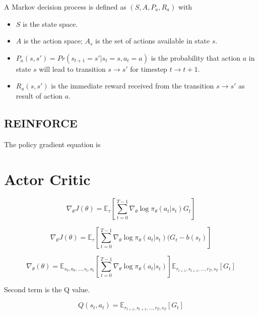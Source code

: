 \documentclass[8pt,oneside]{book}
\begin{document}
A Markov decision process is defined as $(S,A,P_a,R_a)$ with

\begin{itemize}
    \item $S$ is the state space.
    \item $A$ is the action space; $A_s$ is the set of actions available
        in state $s$.
    \item $P_a (s, s' ) = Pr(s_{t+1} = s' | s_t = s, a_t =a)$ is the
        probability that action $a$ in state $s$ will lead to transition
        $s\rightarrow s'$ for timestep $t\rightarrow t+1$.
    \item $R_a(s,s')$ is the immediate reward received from the transition
        $s\rightarrow s'$ as result of action $a$.
\end{itemize}

\newpage

\section{REINFORCE}

The policy gradient equation is

\chapter{Actor Critic}

\begin{equation}
    \nabla_\theta J(\theta) = \mathbb{E}_\tau \left[
        \sum_{t=0}^{T-1}\nabla_\theta\log\pi_\theta\left(a_t|s_t\right)G_t\right]
\end{equation}


\begin{equation}
    \nabla_\theta J(\theta) = \mathbb{E}_\tau \left[
    \sum_{t=0}^{T-1}\nabla_\theta\log\pi_\theta\left(a_t|s_t\right)(G_t - b(s_t)\right]
\end{equation}

\begin{equation}
    \nabla_\theta(\theta)
    =
    \mathbb{E}_{s_0,a_0,\ldots,s_t,a_t}
    \left[\sum_{t=0}^{T-1} \nabla_\theta \log\pi_\theta(a_t|s_t)\right]
        \mathbb{E}_{r_{t+1},s_{t+1},\ldots,r_T,s_T}
        \left[G_t\right]
\end{equation}

Second term is the Q value.

\begin{equation}
    Q(s_t,a_t) = \mathbb{E}_{r_{t+1},s_{t+1},\ldots,r_T,s_T}
    \left[G_t\right]
\end{equation}
\end{document}

